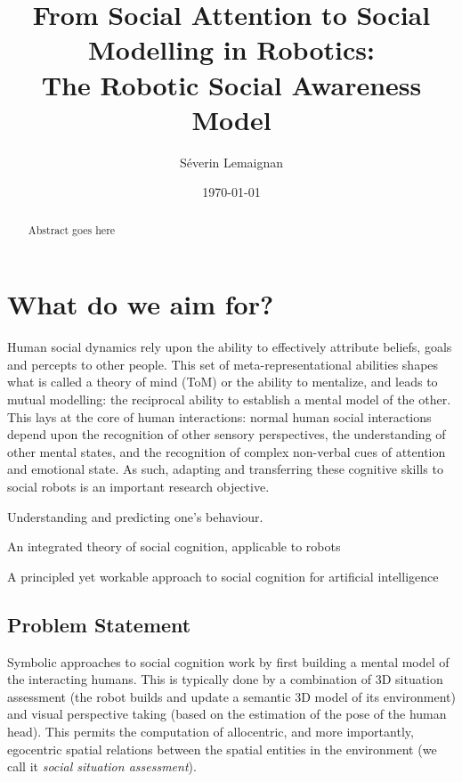 \documentclass[a4paper]{article}
\title{From Social Attention to Social Modelling in Robotics:\\ The Robotic Social Awareness Model}
\author{Séverin Lemaignan}
\date{\today}
\begin{document}
\maketitle

\begin{abstract}
Abstract goes here
\end{abstract}

\section{What do we aim for?}

Human social dynamics rely upon the ability to effectively attribute beliefs,
goals and percepts to other people. This set of meta-representational abilities
shapes what is called a theory of mind (ToM) or the ability to mentalize, and
leads to mutual modelling: the reciprocal ability to establish a mental model of
the other. This lays at the core of human interactions: normal human social
interactions depend upon the recognition of other sensory perspectives, the
understanding of other mental states, and the recognition of complex non-verbal
cues of attention and emotional state. As such, adapting and transferring these
cognitive skills to social robots is an important research objective.


Understanding and predicting one's behaviour.

An integrated theory of social cognition, applicable to robots

A principled yet workable approach to social cognition for artificial intelligence


\subsection{Problem Statement}


Symbolic approaches to social cognition work by first building a mental model of the
interacting humans. This is typically done by a combination of 3D situation
assessment (the robot builds and update a semantic 3D model of its environment)
and visual perspective taking (based on the estimation of the pose of the human
head). This permits the computation of allocentric, and more importantly,
egocentric spatial relations between the spatial entities in the environment
(we call it \emph{social situation assessment}).
\end{document}
